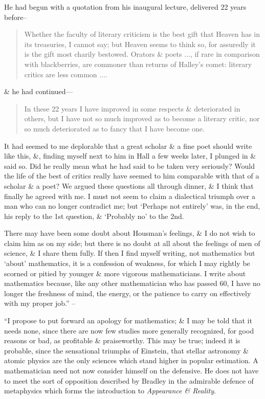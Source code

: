 \documentclass{article}
\numberwithin{equation}{section}
\begin{document}
He had begun with a quotation from his inaugural lecture, delivered 22 years before--
\begin{quotation}
	Whether the faculty of literary criticism is the best gift that Heaven has in its treasuries, I cannot say; but Heaven seems to think so, for assuredly it is the gift most charily bestowed. Orators \& poets $\ldots$, if rare in comparison with blackberries, are commoner than returns of Halley's comet: literary critics are less common $\ldots$.
\end{quotation}
\& he had continued---
\begin{quotation}
	In these 22 years I have improved in some respects \& deteriorated in others, but I have not so much improved as to become a literary critic, nor so much deteriorated as to fancy that I have become one.
\end{quotation}
It had seemed to me deplorable that a great scholar \& a fine poet should write like this, \&, finding myself next to him in Hall a few weeks later, I plunged in \& said so. Did he really mean what he had said to be taken very seriously? Would the life of the best of critics really have seemed to him comparable with that of a scholar \& a poet? We argued these questions all through dinner, \& I think that finally he agreed with me. I must not seem to claim a dialectical triumph over a man who can no longer contradict me; but `Perhaps not entirely' was, in the end, his reply to the 1st question, \& `Probably no' to the 2nd.

There may have been some doubt about Housman's feelings, \& I do not wish to claim him as on my side; but there is no doubt at all about the feelings of men of science, \& I share them fully. If then I find myself writing, not mathematics but `about' mathematics, it is a confession of weakness, for which I may rightly be scorned or pitied by younger \& more vigorous mathematicians. I write about mathematics because, like any other mathematician who has passed 60, I have no longer the freshness of mind, the energy, or the patience to carry on effectively with my proper job.'' -- \cite[pp. 61--63]{Hardy1992}

 ``I propose to put forward an apology for mathematics; \& I may be told that it needs none, since there are now few studies more generally recognized, for good reasons or bad, as profitable \& praiseworthy. This may be true; indeed it is probable, since the sensational triumphs of Einstein, that stellar astronomy \& atomic physics are the only sciences which stand higher in popular estimation. A mathematician need not now consider himself on the defensive. He does not have to meet the sort of opposition described by Bradley in the admirable defence of metaphysics which forms the introduction to \textit{Appearance \& Reality}.
\end{document}
